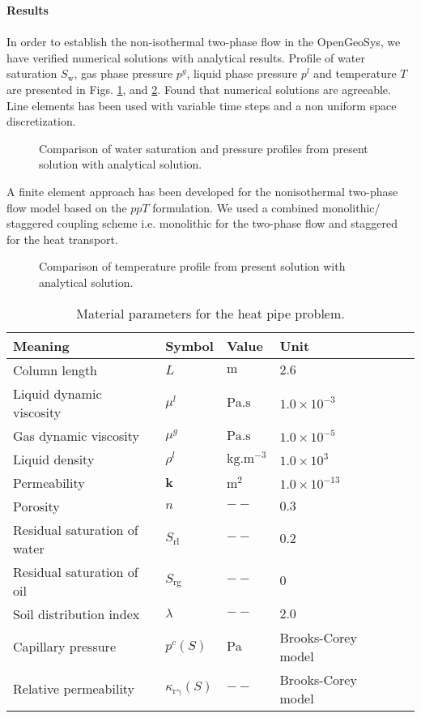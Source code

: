 \textbf{Results}\\\\
In order to establish the non-isothermal two-phase flow in the OpenGeoSys, we have verified numerical solutions with analytical results. Profile of water saturation $S_{\mathrm w}$, gas phase pressure $p^g$, liquid phase pressure $p^l$ and temperature $T$ are presented in Figs. \ref{Fig:HP2}, and \ref{Fig:HP4}. Found that numerical solutions are agreeable. Line elements has been used with variable time steps and a non uniform space discretization.
\begin{figure}[thbp]
\centerline{
}
\caption{Comparison of water saturation and pressure profiles from present solution with analytical solution.}
\label{Fig:HP2}
\end{figure}
A finite element approach has been developed for the nonisothermal two-phase flow model based on the $ppT$ formulation. We used a combined monolithic/ staggered coupling scheme i.e. monolithic for the two-phase flow and staggered for the heat transport.
\begin{figure}[htb]
\begin{center}
\end{center}
\caption{Comparison of temperature profile from present solution with analytical solution.}
\label{Fig:HP4}
\end{figure}
\begin{table}[htbp]
\caption{Material parameters for the heat pipe problem.}
\label{tab:HP1}
\begin{tabular}{l*{4}{l}r}
\hline
\textbf{Meaning} & \textbf{Symbol} &  \textbf{Value} &  \textbf{Unit} \\
\hline
Column length & $L$ & $\mathrm m$ & $2.6$  \\
Liquid dynamic viscosity &  $\mu^l$ & $\mathrm {Pa.s}$ & $1.0\times10^{-3}$ \\
Gas dynamic viscosity & $\mu^g$ & $\mathrm {Pa.s}$ & $1.0\times10^{-5}$ \\
Liquid density &  $\rho^l$ &$\mathrm {kg.m^{-3}}$ & $1.0\times10^{3}$ \\
Permeability & $\mathbf k$ & $ \mathrm {m^2}$ & $1.0\times 10^{-13}$ \\
Porosity & $n$ & $--$ & $0.3$ \\
Residual saturation of water &  $S_{\mathrm{rl}}$ & $--$ & $0.2$ \\
Residual saturation of oil &  $S_{\mathrm{rg}}$ & $--$ & $0$ \\
Soil distribution index &  $\lambda$ & $--$ & $2.0$ \\
Capillary pressure & $p^c(S)$ & $\mathrm {Pa}$ & Brooks-Corey model\\
Relative permeability & $\kappa_{\mathrm {r\gamma}}(S)$ & $--$ & Brooks-Corey model \\ \hline
\end{tabular}
\end{table}

